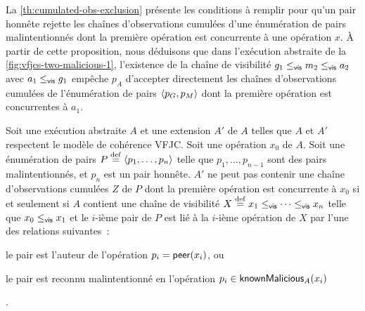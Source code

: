 La \autoref{th:cumulated-obs-exclusion} présente les conditions à remplir pour qu'un pair honnête rejette les chaînes d'observations cumulées d'une énumération de pairs malintentionnés dont la première opération est concurrente à une opération $x$.
À partir de cette proposition, nous déduisons que dans l'exécution abstraite de la \autoref{fig:vfjcs-two-malicious-1}, l'existence de la chaîne de visibilité $g_1 \viseq m_2 \viseq a_2$ avec $a_1 \viseq g_1$ empêche $p_A$ d'accepter directement les chaînes d'observations cumulées de l'énumération de pairs $\tuple*{p_G, p_M}$ dont la première opération est concurrentes à $a_1$.

\begin{proposition}\label{th:cumulated-obs-exclusion}
Soit une exécution abstraite $A$ et une extension $A'$ de $A$ telles que $A$ et $A'$ respectent le modèle de cohérence \ac{VFJC}.
Soit une opération $x_0$ de $A$.
Soit une énumération de pairs $P \defeq \tuple*{p_1, \dotsc ,p_n}$ telle que $p_1, \dotsc, p_{n-1}$ sont des pairs malintentionnés, et $p_n$ est un pair honnête.
$A'$ ne peut pas contenir une chaîne d'observations cumulées $Z$ de $P$ dont la première opération est concurrente à $x_0$ si et seulement si $A$ contient une chaîne de visibilité $X \defeq x_1 \viseq \dotsb \viseq x_n$ telle que $x_0 \viseq x_1$ et le $i$-ième pair de $P$ est lié à la $i$-ième opération de $X$ par l'une des relations suivantes~: \begin{inlinelist}
    \item le pair est l'auteur de l'opération $p_i = \trm{peer}(x_i)$, ou
    \item le pair est reconnu malintentionné en l'opération $p_i \in \trm{knownMalicious}_A(x_i)$
\end{inlinelist}.
\end{proposition}


